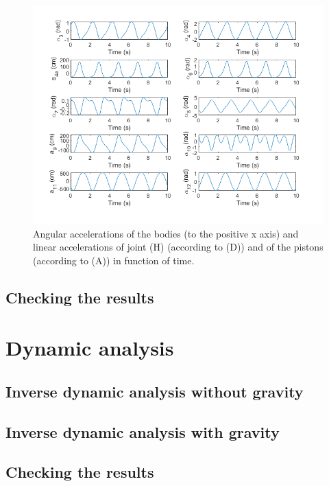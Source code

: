 \documentclass[a4paper]{article}
\begin{document}
\begin{figure}
	\centering
	
	\includegraphics[width = \textwidth]{kinacc.png}
	
	\caption{Angular accelerations of the bodies (to the positive x axis) and linear accelerations of joint (H) (according to (D)) and of the pistons (according to (A)) in function of time.}
	\label{fig:kinacc}
	
\end{figure}

\subsection{Checking the results}

\section{Dynamic analysis}

\subsection{Inverse dynamic analysis without gravity}

\subsection{Inverse dynamic analysis with gravity}

\subsection{Checking the results}



\end{document}
